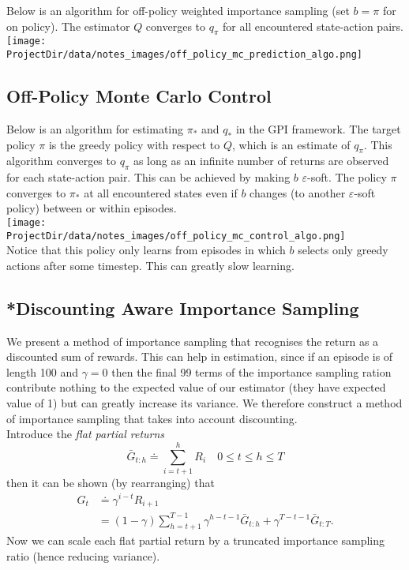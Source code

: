 Below is an algorithm for off-policy weighted importance sampling (set $b=\pi$ for on policy). The estimator $Q$ converges to $q_\pi$ for all encountered state-action pairs.\\

\texttt{[image: \\ProjectDir/data/notes\_images/off\_policy\_mc\_prediction\_algo.png]}\\


\subsection{Off-Policy Monte Carlo Control}
Below is an algorithm for estimating $\pi_*$ and $q_*$ in the GPI framework. The target policy $\pi$ is the greedy policy with respect to $Q$, which is an estimate of $q_\pi$. This algorithm converges to $q_\pi$ as long as an infinite number of returns are observed for each state-action pair. This can be achieved by making $b$ $\varepsilon$-soft. The policy $\pi$ converges to $\pi_*$ at all encountered states even if $b$ changes (to another $\varepsilon$-soft policy) between or within episodes.\\

\texttt{[image: \\ProjectDir/data/notes\_images/off\_policy\_mc\_control\_algo.png]}\\

Notice that this policy only learns from episodes in which $b$ selects only greedy actions after some timestep. This can greatly slow learning.

\subsection{*Discounting Aware Importance Sampling}
We present a method of importance sampling that recognises the return as a discounted sum of rewards. This can help in estimation, since if an episode is of length 100 and $\gamma = 0$ then the final 99 terms of the importance sampling ration contribute nothing to the expected value of our estimator (they have expected value of 1) but can greatly increase its variance. We therefore construct a method of importance sampling that takes into account discounting.\\

Introduce the \emph{flat partial returns}
\[
    \bar{G}_{t:h} \doteq \sum_{i=t+1}^h R_{i} \quad 0 \leq t \leq h \leq T
\]
then it can be shown (by rearranging) that
\begin{align}
    G_t &\doteq \gamma^{i-t}R_{i+1}\\
        &= (1 - \gamma)\sum_{h=t+1}^{T-1}\gamma^{h-t-1}\bar{G}_{t:h} + \gamma^{T-t-1}\bar{G}_{t:T}.
\end{align}
Now we can scale each flat partial return by a truncated importance sampling ratio (hence reducing variance).\\

